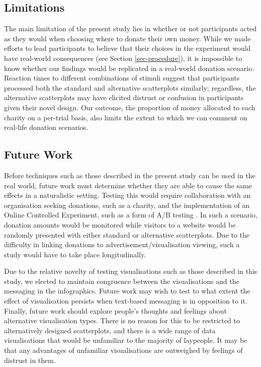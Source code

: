 \documentclass[
  authoryear,
  preprint,
  3p]{elsarticle}
\begin{document}
\subsection{Limitations}\label{limitations}

The main limitation of the present study lies in whether or not
participants acted as they would when choosing where to donate their own
money. While we made efforts to lead participants to believe that their
choices in the experiment would have real-world consequences (see
Section \ref{sec-procedure}), it is impossible to know whether our
findings would be replicated in a real-world donation scenario. Reaction
times to different combinations of stimuli suggest that participants
processed both the standard and alternative scatterplots similarly;
regardless, the alternative scatterplots may have elicited distrust or
confusion in participants given their novel design. Our outcome, the
proportion of money allocated to each charity on a per-trial basis, also
limits the extent to which we can comment on real-life donation
scenarios.

\subsection{Future Work}\label{sec-future-work}

Before techniques such as those described in the present study can be
used in the real world, future work must determine whether they are able
to cause the same effects in a naturalistic setting. Testing this would
require collaboration with an organisation seeking donations, such as a
charity, and the implementation of an Online Controlled Experiment, such
as a form of A/B testing \citep{kohavi_2023}. In such a scenario,
donation amounts would be monitored while visitors to a website would be
randomly presented with either standard or alternative scatterplots. Due
to the difficulty in linking donations to advertisement/visualisation
viewing, such a study would have to take place longitudinally.

Due to the relative novelty of testing visualisations such as those
described in this study, we elected to maintain congruence between the
visualisations and the messaging in the infographics. Future work may
wish to test to what extent the effect of visualisation persists when
text-based messaging is in opposition to it. Finally, future work should
explore people's thoughts and feelings about alternative visualisation
types. There is no reason for this to be restricted to alternatively
designed scatterplots, and there is a wide range of data visualisations
that would be unfamiliar to the majority of laypeople. It may be that
any advantages of unfamiliar visualisations are outweighed by feelings
of distrust in them.
\end{document}

